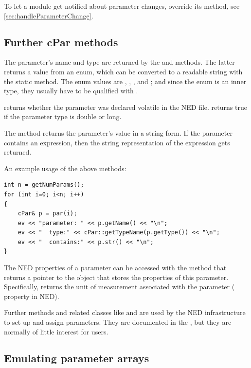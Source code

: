 To let a module get notified about parameter changes, override
its  method, see
\ref{sec:handleParameterChange}.


\subsection{Further cPar methods}

The parameter's name and type are returned by the  and
 methods. The latter returns a value from an enum,
which can be converted to a readable string with the 
static method. The enum values are , , ,
 and ; and since the enum is an inner type,
they usually have to be qualified with .

 returns whether the parameter was declared volatile
in the NED file.  returns true if the parameter
type is double or long.

The  method returns the parameter's value in a string form.
If the parameter contains an expression, then the string representation
of the expression gets returned.

An example usage of the above methods:

\begin{verbatim}
int n = getNumParams();
for (int i=0; i<n; i++)
{
    cPar& p = par(i);
    ev << "parameter: " << p.getName() << "\n";
    ev << "  type:" << cPar::getTypeName(p.getType()) << "\n";
    ev << "  contains:" << p.str() << "\n";
}
\end{verbatim}

The NED properties of a parameter can be accessed with the 
method that returns a pointer to the  object that stores
the properties of this parameter. Specifically,  returns
the unit of measurement associated with the parameter ( property in NED).

Further  methods and related classes like  and
 are used by the NED infrastructure to set up and
assign parameters. They are documented in the , but
they are normally of little interest for users.


\subsection{Emulating parameter arrays}

